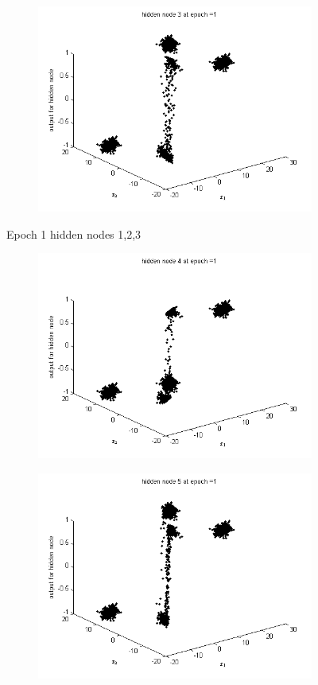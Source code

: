 \documentclass{article}
\begin{document}
\begin{flushleft}
\begin{figure}
\begin{subfigure}{.3\textwidth}
\end{subfigure}
\begin{subfigure}{.3\textwidth}
  \centering
  \includegraphics[width=.8\linewidth]{Classification/linearlySeparable/h1_3}
  
\end{subfigure}
\caption{Epoch 1 hidden nodes 1,2,3}
\end{figure}

\begin{figure}
\begin{subfigure}{.3\textwidth}
  \centering
  \includegraphics[width=.8\linewidth]{Classification/linearlySeparable/h1_4}
 
\end{subfigure}%
\begin{subfigure}{.3\textwidth}
  \centering
  \includegraphics[width=.8\linewidth]{Classification/linearlySeparable/h1_5}
  

\end{subfigure}
\end{figure}
\end{flushleft}
\end{document}
